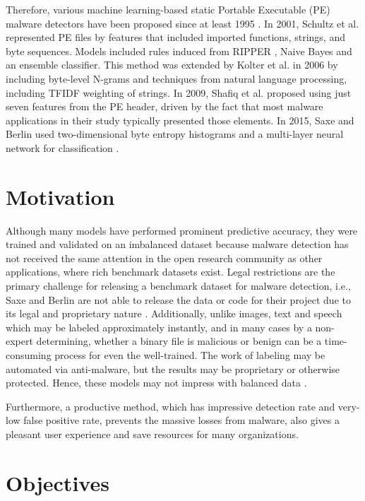 Therefore, various machine learning-based static Portable Executable (PE) malware detectors have been proposed since at least 1995 \cite{kephart1995biologically,schultz2001data,kolter2006learning,Shafiq2009AFF,saxe2015deep}.
In 2001, Schultz et al. \cite{schultz2001data} represented PE files by features that included imported functions, strings, and byte sequences. 
Models included rules induced from RIPPER \cite{cohen1995fast}, Naive Bayes and an ensemble classifier. 
This method was extended by Kolter et al. in 2006 \cite{kolter2006learning} by including byte-level N-grams and techniques from natural language processing, including TFIDF weighting of strings. 
In 2009, Shafiq et al. \cite{Shafiq2009AFF} proposed using just seven features from the PE header, driven by the fact that most malware applications in their study typically presented those elements. 
In 2015, Saxe and Berlin used two-dimensional byte entropy histograms and a multi-layer neural network for classification \cite{saxe2015deep}.

\section{Motivation}
\label{sec:motivation}

Although many models have performed prominent predictive accuracy, they were trained and validated on an imbalanced dataset because malware detection has not received the same attention in the open research community as other applications, where rich benchmark datasets exist. 
Legal restrictions are the primary challenge for releasing a benchmark dataset for malware detection, i.e., Saxe and Berlin are not able to release the data or code for their project due to its legal and proprietary nature \cite{saxe2015deep}. 
Additionally, unlike images, text and speech which may be labeled approximately instantly, and in many cases by a non-expert determining, whether a binary file is malicious or benign can be a time-consuming process for even the well-trained. 
The work of labeling may be automated via anti-malware, but the results may be proprietary or otherwise protected. Hence, these models may not impress with balanced data \cite{chawla2009data}.

Furthermore, a productive method, which has impressive detection rate and very-low false positive rate, prevents the massive losses from malware, also gives a pleasant user experience and save resources for many organizations.

\section{Objectives}
\label{sec:objectives}

